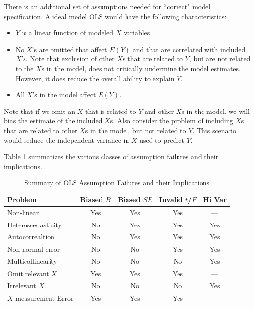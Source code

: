 \documentclass[11pt,openany]{book}\usepackage[]{graphicx}\usepackage[]{color}
\begin{document}
{There is an additional set of assumptions needed for ``correct" model specification. A ideal model OLS would have the following characteristics: 
\begin{itemize}
\item $Y$ is a linear function of modeled $X$ variables
\item No $X$'s are omitted that affect $E(Y)$ and that are correlated with included $X$'s. Note that exclusion of other $X$s that are related to $Y$, but are not related to the $X$s in the model, does not critically undermine the model estimates. However, it does reduce the overall ability to explain $Y$. 
\item All $X$'s in the model affect $E(Y)$.  
\end{itemize}
Note that if we omit an $X$ that is related to $Y$ and other $X$s in the model, we will bias the estimate of the included $X$s.  Also consider the problem of including $X$s that are related to other $X$s in the model, but not related  to $Y$. This scenario would reduce the independent variance in $X$ used to predict $Y$.

Table \ref{tab:ass} summarizes the various classes of assumption failures and their implications. 

\begin{center}
\begin{table}[h]
\caption{Summary of OLS Assumption Failures and their Implications}
\label{tab:ass}
\begin{tabular}{lcccc}
\hline
Problem               & Biased $B$ & Biased $SE$ & Invalid $t$/$F$ & Hi Var \\
\hline
Non-linear            & Yes        & Yes         & Yes             & ---    \\
Heteroscedasticity    & No         & Yes         & Yes             & Yes    \\
Autocorrealtion       & No         & Yes         & Yes             & Yes    \\
Non-normal error      & No         & No          & Yes             & Yes    \\
Multicollinearity     & No         & No          & No              & Yes    \\
Omit relevant $X$     & Yes        & Yes         & Yes             & ---    \\
Irrelevant $X$        & No         & No          & No              & Yes    \\
$X$ measurement Error & Yes        & Yes         & Yes             & ---   \\
\hline
\end{tabular}
\end{table}
\end{center}

}
\end{document}
